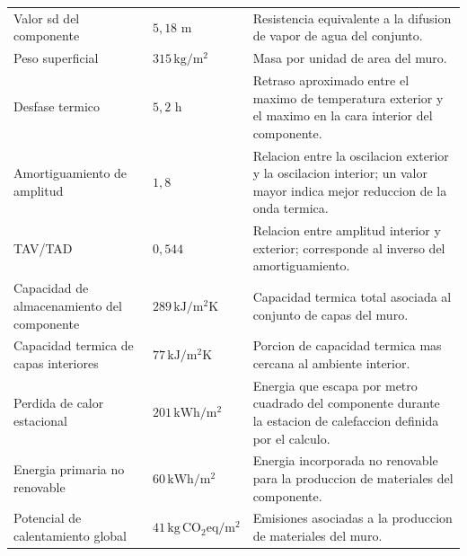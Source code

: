 {\begin{longtable}{p{4.4cm}p{2.8cm}p{6.1cm}}
  Valor sd del componente & $5,18$ m & Resistencia equivalente a la difusion de vapor de agua del conjunto. \\
  Peso superficial & $315\,\mathrm{kg/m^2}$ & Masa por unidad de area del muro. \\
  Desfase termico & $5,2$ h & Retraso aproximado entre el maximo de temperatura exterior y el maximo en la cara interior del componente. \\
  Amortiguamiento de amplitud & $1,8$ & Relacion entre la oscilacion exterior y la oscilacion interior; un valor mayor indica mejor reduccion de la onda termica. \\
  TAV/TAD & $0,544$ & Relacion entre amplitud interior y exterior; corresponde al inverso del amortiguamiento. \\
  Capacidad de almacenamiento del componente & $289\,\mathrm{kJ/m^2K}$ & Capacidad termica total asociada al conjunto de capas del muro. \\
  Capacidad termica de capas interiores & $77\,\mathrm{kJ/m^2K}$ & Porcion de capacidad termica mas cercana al ambiente interior. \\
  Perdida de calor estacional & $201\,\mathrm{kWh/m^2}$ & Energia que escapa por metro cuadrado del componente durante la estacion de calefaccion definida por el calculo. \\
  Energia primaria no renovable & $60\,\mathrm{kWh/m^2}$ & Energia incorporada no renovable para la produccion de materiales del componente. \\
  Potencial de calentamiento global & $41\,\mathrm{kg\,CO_2eq/m^2}$ & Emisiones asociadas a la produccion de materiales del muro. \\
\end{longtable}
}

